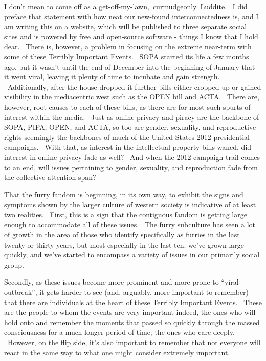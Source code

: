 I don't mean to come off as a get-off-my-lawn,~curmudgeonly~Luddite. ~I
did preface that statement with how neat our new-found
interconnectedness is, and I am writing this on a website, which will be
published to three separate social sites and is powered by free and
open-source software - things I know that I hold dear. ~There is,
however, a problem in focusing on the extreme near-term with some of
these Terribly Important Events. ~SOPA started its life a few months
ago, but it wasn't until the end of December into the beginning of
January that it went viral, leaving it plenty of time to incubate and
gain strength. ~Additionally, after the house dropped it further bills
either cropped up or gained visibility in the mediacentric west such as
the OPEN bill and ACTA. ~There are, however, root causes to each of
these bills, as there are for most such spurts of interest within the
media. ~Just as online privacy and piracy are the backbone of SOPA,
PIPA, OPEN, and ACTA, so too are gender, sexuality, and reproductive
rights seemingly the backbones of much of the United States 2012
presidential campaigns. ~With that, as interest in the intellectual
property bills waned, did interest in online privacy fade as well? ~And
when the 2012 campaign trail comes to an end, will issues pertaining to
gender, sexuality, and reproduction fade from the collective attention
span?

That the furry fandom is beginning, in its own way, to exhibit the signs
and symptoms shown by the larger culture of western society is
indicative of at least two realities. ~First, this is a sign that the
contiguous fandom is getting large enough to accommodate all of these
issues. ~The furry subculture has seen a lot of growth in the area of
those who identify specifically as furries in the last twenty or thirty
years, but most especially in the last ten: we've grown large quickly,
and we've started to encompass a variety of issues in our primarily
social group.

Secondly, as these issues become more prominent and more prone to
``viral outbreak'', it gets harder to see (and, arguably, more important
to remember) that there are individuals at the heart of these Terribly
Important Events. ~These are the people to whom the events are very
important indeed, the ones who will hold onto and remember the moments
that passed so quickly through the massed consciousness for a much
longer period of time; the ones who care deeply. ~However, on the flip
side, it's also important to remember that not everyone will react in
the same way to what one might consider extremely important.

